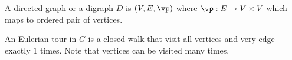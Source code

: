\begin{definition}
	A \underline{directed graph or a digraph} \( D \) is \( (V,E, \vp) \) where \( \vp: E \to V \times V \) which maps to ordered pair of vertices.
\end{definition}

\begin{definition}
	An \underline{Eulerian tour} in \( G \) is a closed walk that visit all vertices and very edge exactly \( 1 \) times. Note that vertices can be visited many times.
\end{definition}


